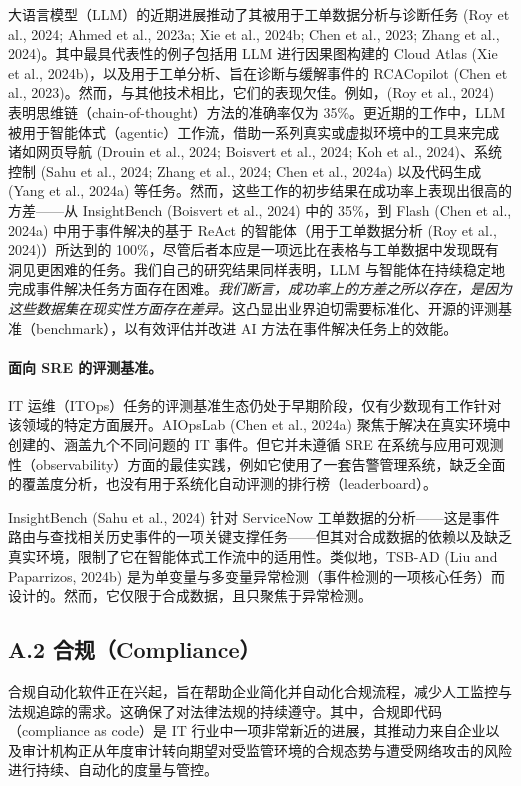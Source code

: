 \documentclass[10pt,UTF8,fontset=fandol]{ctexart}
\begin{document}
大语言模型（LLM）的近期进展推动了其被用于工单数据分析与诊断任务 (Roy et al., 2024; Ahmed et al., 2023a; Xie et al., 2024b; Chen et al., 2023; Zhang et al., 2024)。其中最具代表性的例子包括用 LLM 进行因果图构建的 Cloud Atlas (Xie et al., 2024b)，以及用于工单分析、旨在诊断与缓解事件的 RCACopilot (Chen et al., 2023)。然而，与其他技术相比，它们的表现欠佳。例如，(Roy et al., 2024) 表明思维链（chain-of-thought）方法的准确率仅为 35\%。更近期的工作中，LLM 被用于智能体式（agentic）工作流，借助一系列真实或虚拟环境中的工具来完成诸如网页导航 (Drouin et al., 2024; Boisvert et al., 2024; Koh et al., 2024)、系统控制 (Sahu et al., 2024; Zhang et al., 2024; Chen et al., 2024a) 以及代码生成 (Yang et al., 2024a) 等任务。然而，这些工作的初步结果在成功率上表现出很高的方差——从 InsightBench (Boisvert et al., 2024) 中的 35\%，到 Flash (Chen et al., 2024a) 中用于事件解决的基于 ReAct 的智能体（用于工单数据分析 (Roy et al., 2024)）所达到的 100\%，尽管后者本应是一项远比在表格与工单数据中发现既有洞见更困难的任务。我们自己的研究结果同样表明，LLM 与智能体在持续稳定地完成事件解决任务方面存在困难。\textit{我们断言，成功率上的方差之所以存在，是因为这些数据集在现实性方面存在差异。}这凸显出业界迫切需要标准化、开源的评测基准（benchmark），以有效评估并改进 AI 方法在事件解决任务上的效能。

\paragraph{面向 SRE 的评测基准。}
IT 运维（ITOps）任务的评测基准生态仍处于早期阶段，仅有少数现有工作针对该领域的特定方面展开。AIOpsLab (Chen et al., 2024a) 聚焦于解决在真实环境中创建的、涵盖九个不同问题的 IT 事件。但它并未遵循 SRE 在系统与应用可观测性（observability）方面的最佳实践，例如它使用了一套告警管理系统，缺乏全面的覆盖度分析，也没有用于系统化自动评测的排行榜（leaderboard）。

InsightBench (Sahu et al., 2024) 针对 ServiceNow 工单数据的分析——这是事件路由与查找相关历史事件的一项关键支撑任务——但其对合成数据的依赖以及缺乏真实环境，限制了它在智能体式工作流中的适用性。类似地，TSB-AD (Liu and Paparrizos, 2024b) 是为单变量与多变量异常检测（事件检测的一项核心任务）而设计的。然而，它仅限于合成数据，且只聚焦于异常检测。

\subsection{A.2 合规（Compliance）}

合规自动化软件正在兴起，旨在帮助企业简化并自动化合规流程，减少人工监控与法规追踪的需求。这确保了对法律法规的持续遵守。其中，合规即代码（compliance as code）是 IT 行业中一项非常新近的进展，其推动力来自企业以及审计机构正从年度审计转向期望对受监管环境的合规态势与遭受网络攻击的风险进行持续、自动化的度量与管控。
\end{document}
